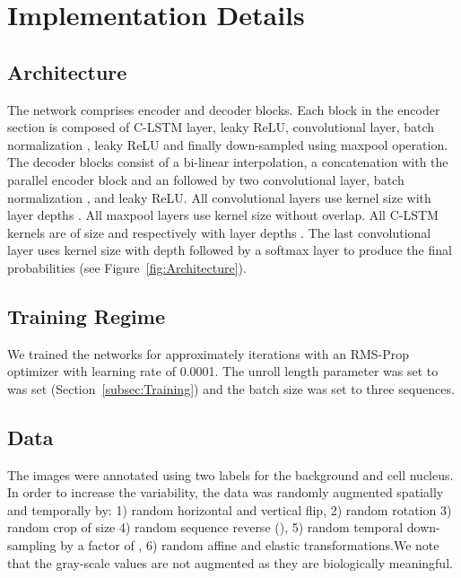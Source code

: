 \documentclass{article}
\begin{document}
\section{Implementation Details}\label{sec:Implementation Details}

\subsection{Architecture}
The network comprises  encoder and decoder blocks. Each block in the encoder section is composed of C-LSTM layer, leaky ReLU, convolutional layer, batch normalization \cite{ioffe2015batchnorm}, leaky ReLU and finally down-sampled using maxpool operation. The decoder blocks consist of a bi-linear interpolation, a concatenation with the parallel encoder block and  an followed by two convolutional layer, batch normalization \cite{ioffe2015batchnorm}, and leaky ReLU.  All convolutional layers use kernel size  with layer depths . All maxpool layers use kernel size  without overlap. All C-LSTM kernels are of size  and  respectively with layer depths . The last convolutional layer uses kernel size  with depth  followed by a softmax layer to produce the final probabilities (see Figure~\ref{fig:Architecture}).

\subsection{Training Regime}

We trained the networks for approximately  iterations with an RMS-Prop optimizer \cite{HintonRMSPROP} with learning rate of 0.0001. The unroll length parameter was set to  was set (Section~\ref{subsec:Training}) and the batch size was set to three sequences. 

\subsection{Data}
The images were annotated using two labels for the background and cell nucleus. In order to increase the variability, the data was randomly augmented spatially and temporally by: 1) random horizontal and vertical flip, 2) random  rotation 3) random crop of size  4) random sequence reverse (), 5) random temporal down-sampling by a factor of , 6) random affine and elastic transformations.We note that the gray-scale values are not augmented as they are biologically meaningful.
\end{document}
